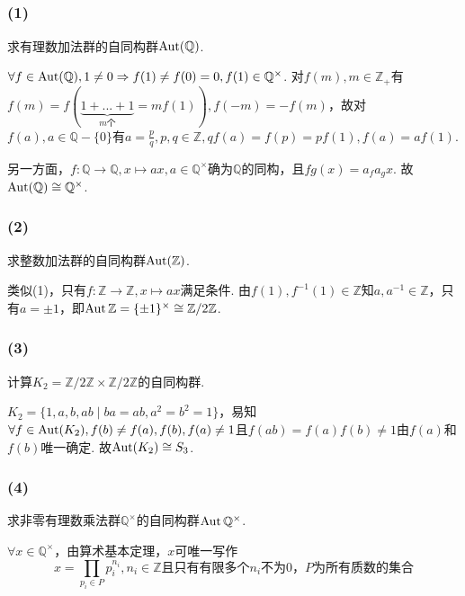 
\subsection{}
\subsubsection{(1)}
求有理数加法群的自同构群$\operatorname{Aut}(\mathbb{Q})$.

\jie
$\forall f\in\operatorname{Aut}(\mathbb{Q}), 1\neq 0\Rightarrow f(1)\neq f(0)=0, f(1)\in\mathbb{Q}^{\times}$. 对$f(m), m\in\mathbb{Z}_+$有$f(m)=f(\underbrace{1+...+1}_{m\text{个}}=mf(1)), f(-m)=-f(m)$，故对$f(a), a\in\mathbb{Q}-\{0\}$有$a=\frac{p}{q}, p,q\in\mathbb{Z}, qf(a)=f(p)=pf(1), f(a)=af(1)$.

另一方面，$f: \mathbb{Q}\rightarrow\mathbb{Q}, x\mapsto ax, a\in\mathbb{Q}^{\times}$确为$\mathbb{Q}$的同构，且$fg(x)=a_fa_gx$. 故$\operatorname{Aut}(\mathbb{Q})\cong\mathbb{Q}^{\times}$.

\subsubsection{(2)}
求整数加法群的自同构群$\operatorname{Aut}(\mathbb{Z})$.

\jie
类似(1)，只有$f: \mathbb{Z}\rightarrow\mathbb{Z}, x\mapsto ax$满足条件. 由$f(1), f^{-1}(1)\in\mathbb{Z}$知$a, a^{-1}\in\mathbb{Z}$，只有$a=\pm1$，即$\operatorname{Aut}\mathbb{Z}=\{\pm1\}^{\times}\cong\mathbb{Z}/2\mathbb{Z}$.

\subsubsection{(3)}
计算$K_2=\mathbb{Z}/2\mathbb{Z}\times\mathbb{Z}/2\mathbb{Z}$的自同构群.

\jie
$K_2=\{1,a,b,ab\mid ba=ab,a^2=b^2=1\}$，易知$\forall f\in\operatorname{Aut}(K_2), f(b)\neq f(a), f(b), f(a)\neq1$且$f(ab)=f(a)f(b)\neq 1$由$f(a)$和$f(b)$唯一确定. 故$\operatorname{Aut}(K_2)\cong S_3$.

\subsubsection{(4)}
求非零有理数乘法群$\mathbb{Q}^{\times}$的自同构群$\operatorname{Aut}\mathbb{Q}^{\times}$. 

\jie
$\forall x\in \mathbb{Q}^{\times}$，由算术基本定理，$x$可唯一写作
$$x=\prod_{p_i\in P}p_i^{n_i}, n_i\in\mathbb{Z}\text{且只有有限多个$n_i$不为0，$P$为所有质数的集合}$$

